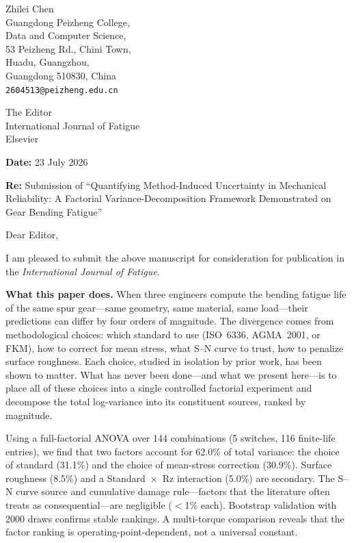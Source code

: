 \documentclass[12pt,a4paper]{article}
\begin{document}
\thispagestyle{empty}

\vspace*{1cm}
\hfill\begin{minipage}{0.45\textwidth}
\raggedleft
Zhilei Chen\\
Guangdong Peizheng College,\\
Data and Computer Science,\\
53 Peizheng Rd., Chini Town,\\
Huadu, Guangzhou,\\
Guangdong 510830, China\\[4pt]
\texttt{2604513@peizheng.edu.cn}
\end{minipage}

\vspace{1cm}
\noindent The Editor\\
International Journal of Fatigue\\
Elsevier

\vspace{0.8cm}
\noindent\textbf{Date:} 23 July 2026

\vspace{0.3cm}
\noindent\textbf{Re:} Submission of ``Quantifying Method-Induced Uncertainty in
Mechanical Reliability: A Factorial Variance-Decomposition Framework
Demonstrated on Gear Bending Fatigue''

\vspace{0.8cm}
\noindent Dear Editor,

\vspace{0.3cm}
I am pleased to submit the above manuscript for consideration for
publication in the \textit{International Journal of Fatigue}.

\vspace{0.3cm}
\noindent\textbf{What this paper does.}
When three engineers compute the bending fatigue life of the same spur
gear---same geometry, same material, same load---their predictions can differ
by four orders of magnitude. The divergence comes from methodological choices:
which standard to use (ISO~6336, AGMA~2001, or FKM), how to correct for mean
stress, what S--N curve to trust, how to penalize surface roughness. Each
choice, studied in isolation by prior work, has been shown to matter.
What has never been done---and what we present here---is to place all
of these choices into a single controlled factorial experiment and decompose
the total log-variance into its constituent sources, ranked by magnitude.

Using a full-factorial ANOVA over 144 combinations (5 switches, 116
finite-life entries), we find that two factors account for 62.0\% of total
variance: the choice of standard (31.1\%) and the choice of mean-stress
correction (30.9\%). Surface roughness (8.5\%) and a Standard~$\times$~Rz
interaction (5.0\%) are secondary. The S--N curve source and cumulative
damage rule---factors that the literature often treats as consequential---are
negligible ($<$1\% each). Bootstrap validation with 2000 draws confirms
stable rankings. A multi-torque comparison reveals that the factor ranking
is operating-point-dependent, not a universal constant.
\end{document}
